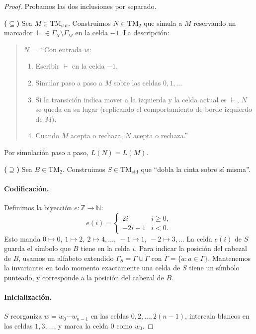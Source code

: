 \documentclass[11pt,a4paper]{article}
\theoremstyle{plain}
\theoremstyle{definition}
\theoremstyle{remark}
\newcommand{\TM}{\mathrm{TM}}
\newcommand{\TMstd}{\TM_{\text{std}}}
\newcommand{\TMtwo}{\TM_{2}}
\begin{document}
\begin{proof}
Probamos las dos inclusiones por separado.

\textbf{($\subseteq$)} Sea $M\in\TMstd$. Construimos $N\in\TMtwo$ que simula
a $M$ reservando un marcador $\vdash\in\Gamma_N\setminus\Gamma_M$ en la celda
$-1$. La descripci\'on:

\begin{quote}
\(N=\) ``Con entrada $w$:
\begin{enumerate}
  \item Escribir $\vdash$ en la celda $-1$.
  \item Simular paso a paso a $M$ sobre las celdas $0,1,\dots$
  \item Si la transici\'on indica mover a la izquierda y la celda actual es
        $\vdash$, $N$ se queda en su lugar (replicando el comportamiento de
        borde izquierdo de $M$).
  \item Cuando $M$ acepta o rechaza, $N$ acepta o rechaza.''
\end{enumerate}
\end{quote}

Por simulaci\'on paso a paso, $L(N) = L(M)$.

\textbf{($\supseteq$)} Sea $B\in\TMtwo$. Construimos $S\in\TMstd$ que ``dobla
la cinta sobre s\'i misma''.

\paragraph{Codificaci\'on.}
Definimos la biyecci\'on $e:\mathbb Z\to\mathbb N$:
\[
  e(i) = \begin{cases} 2i & i\ge 0,\\ -2i-1 & i<0.\end{cases}
\]
Esto manda $0\mapsto 0,\ 1\mapsto 2,\ 2\mapsto 4,\dots,\ -1\mapsto 1,\ -2\mapsto 3,\dots$
La celda $e(i)$ de $S$ guarda el s\'imbolo que $B$ tiene en la celda $i$.
Para indicar la posici\'on del cabezal de $B$, usamos un alfabeto extendido
$\Gamma_S = \Gamma\cup\dot\Gamma$ con $\dot\Gamma=\{\dot a : a\in\Gamma\}$.
Mantenemos la invariante: en todo momento exactamente una celda de $S$ tiene
un s\'imbolo punteado, y corresponde a la posici\'on del cabezal de $B$.

\paragraph{Inicializaci\'on.}
$S$ reorganiza $w=w_0\cdots w_{n-1}$ en las celdas $0,2,\dots,2(n-1)$,
intercala blancos en las celdas $1,3,\dots$, y marca la celda $0$ como
$\dot{w_0}$.


\end{proof}
\end{document}
